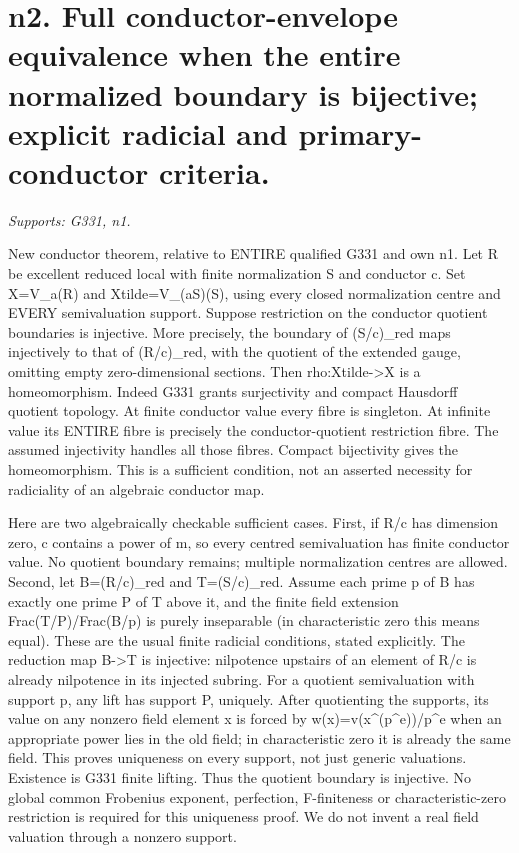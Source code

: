 \section{n2. Full conductor-envelope equivalence when the entire normalized boundary is bijective; explicit radicial and primary-conductor criteria.}
\textit{Supports: G331, n1.}

New conductor theorem, relative to ENTIRE qualified G331 and own n1. Let R be excellent reduced local with finite normalization S and conductor c. Set X=V\_a(R) and Xtilde=V\_(aS)(S), using every closed normalization centre and EVERY semivaluation support. Suppose restriction on the conductor quotient boundaries is injective. More precisely, the boundary of (S/c)\_red maps injectively to that of (R/c)\_red, with the quotient of the extended gauge, omitting empty zero-dimensional sections. Then rho:Xtilde-\textgreater{}X is a homeomorphism. Indeed G331 grants surjectivity and compact Hausdorff quotient topology. At finite conductor value every fibre is singleton. At infinite value its ENTIRE fibre is precisely the conductor-quotient restriction fibre. The assumed injectivity handles all those fibres. Compact bijectivity gives the homeomorphism. This is a sufficient condition, not an asserted necessity for radiciality of an algebraic conductor map.

Here are two algebraically checkable sufficient cases. First, if R/c has dimension zero, c contains a power of m, so every centred semivaluation has finite conductor value. No quotient boundary remains; multiple normalization centres are allowed. Second, let B=(R/c)\_red and T=(S/c)\_red. Assume each prime p of B has exactly one prime P of T above it, and the finite field extension Frac(T/P)/Frac(B/p) is purely inseparable (in characteristic zero this means equal). These are the usual finite radicial conditions, stated explicitly. The reduction map B-\textgreater{}T is injective: nilpotence upstairs of an element of R/c is already nilpotence in its injected subring. For a quotient semivaluation with support p, any lift has support P, uniquely. After quotienting the supports, its value on any nonzero field element x is forced by w(x)=v(x\textasciicircum{}(p\textasciicircum{}e))/p\textasciicircum{}e when an appropriate power lies in the old field; in characteristic zero it is already the same field. This proves uniqueness on every support, not just generic valuations. Existence is G331 finite lifting. Thus the quotient boundary is injective. No global common Frobenius exponent, perfection, F-finiteness or characteristic-zero restriction is required for this uniqueness proof. We do not invent a real field valuation through a nonzero support.

